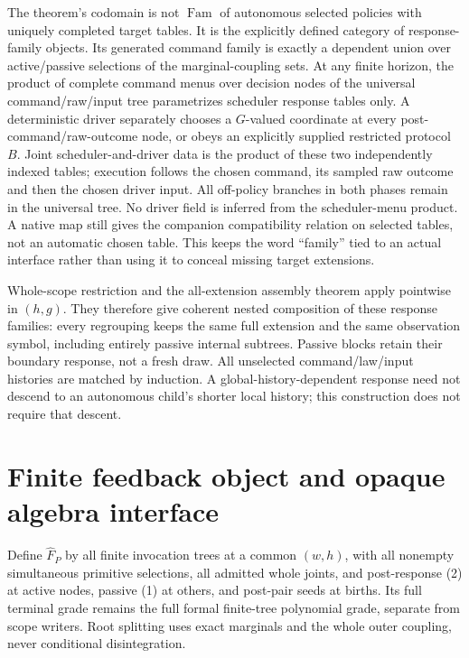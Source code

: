 \documentclass[11pt]{article}
\begin{document}
The theorem's codomain is not $\operatorname{Fam}$ of autonomous selected policies with uniquely completed target tables. It is the explicitly defined category of response-family objects. Its generated command family is exactly a dependent union over active/passive selections of the marginal-coupling sets. At any finite horizon, the product of complete command menus over decision nodes of the universal command/raw/input tree parametrizes scheduler response tables only. A deterministic driver separately chooses a $G$-valued coordinate at every post-command/raw-outcome node, or obeys an explicitly supplied restricted protocol $B$. Joint scheduler-and-driver data is the product of these two independently indexed tables; execution follows the chosen command, its sampled raw outcome and then the chosen driver input. All off-policy branches in both phases remain in the universal tree. No driver field is inferred from the scheduler-menu product. A native map still gives the companion compatibility relation on selected tables, not an automatic chosen table. This keeps the word ``family'' tied to an actual interface rather than using it to conceal missing target extensions.

Whole-scope restriction and the all-extension assembly theorem apply pointwise in $(h,g)$. They therefore give coherent nested composition of these response families: every regrouping keeps the same full extension and the same observation symbol, including entirely passive internal subtrees. Passive blocks retain their boundary response, not a fresh draw. All unselected command/law/input histories are matched by induction. A global-history-dependent response need not descend to an autonomous child's shorter local history; this construction does not require that descent.

\section{Finite feedback object and opaque algebra interface}
Define $\widehat F_P$ by all finite invocation trees at a common $(w,h)$, with all nonempty simultaneous primitive selections, all admitted whole joints, and post-response (2) at active nodes, passive (1) at others, and post-pair seeds at births. Its full terminal grade remains the full formal finite-tree polynomial grade, separate from scope writers. Root splitting uses exact marginals and the whole outer coupling, never conditional disintegration.
\end{document}
